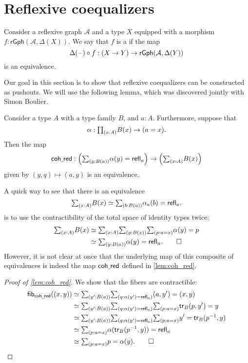 \section{Reflexive coequalizers}

\begin{defn}
Consider a reflexive graph $\mathcal{A}$ and a type $X$ equipped with a morphism $f:\mathsf{rGph}(\mathcal{A},\Delta(X))$. We say that $f$ is a  if the map
\begin{equation*}
\Delta(\mathord{\hspace{1pt}\text{--}\hspace{1pt}}) \circ f: (X\to Y)\to \mathsf{rGph}(\mathcal{A},\Delta(Y))
\end{equation*}
is an equivalence.
\end{defn}

Our goal in this section is to show that reflexive coequalizers can be constructed as pushouts. We will use the following lemma, which was discovered jointly with Simon Boulier.

\begin{lem}\label{lem:coh_red}
Consider a type $A$ with a type family $B$, and $a:A$. Furthermore, suppose that
\begin{equation*}
\alpha:\prd{x:A}B(x)\to (a=x).
\end{equation*}
Then the  map
\begin{equation*}
\mathsf{coh\usc{}red} : \Big(\sm{y:B(a)}\alpha(y)=\refl{a}\Big)\to\Big(\sm{x:A}B(x)\Big)
\end{equation*}
given by $(y,q)\mapsto (a,y)$ is an equivalence.
\end{lem}

\begin{rmk}
A quick way to see that there is an equivalence
\begin{equation*}
\sm{x:A}B(x) \eqvsym \sm{b:B(a)} \alpha_{a}(b)=\refl{a}.
\end{equation*}
is to use the contractibility of the total space of identity types twice:
\begin{align*}
\sm{x:A}B(x) & \eqvsym \sm{x:A}{y:B(x)}{p:a=x}\alpha(y)=p \\
& \eqvsym \sm{y:B(a)}\alpha(y)=\refl{a}.\qedhere
\end{align*}
However, it is not clear at once that the underlying map of this composite of equivalences is indeed the map $\mathsf{coh\underline{\ }{}red}$ defined in \cref{lem:coh_red}.
\end{rmk}

\begin{proof}[Proof of \cref{lem:coh_red}]
We show that the fibers are contractible:
\begin{align*}
\fib{\mathsf{coh\usc{}red}}{(x,y)} & \eqvsym \sm{y':B(a)}{q:\alpha(y')=\refl{a}} (a,y')=(x,y) \\
& \eqvsym \sm{y':B(a)}{q:\alpha(y')=\refl{a}}{p:a=x} \mathsf{tr}_B(p,y')=y \\
& \eqvsym \sm{y':B(a)}{q:\alpha(y')=\refl{a}}{p:a=x} y'=\mathsf{tr}_B(p^{-1},y) \\
& \eqvsym \sm{p:a=x}\alpha(\mathsf{tr}_B(p^{-1},y))=\refl{a} \\
& \eqvsym \sm{p:a=x}p=\alpha(y).\qedhere
\end{align*}
\end{proof}

